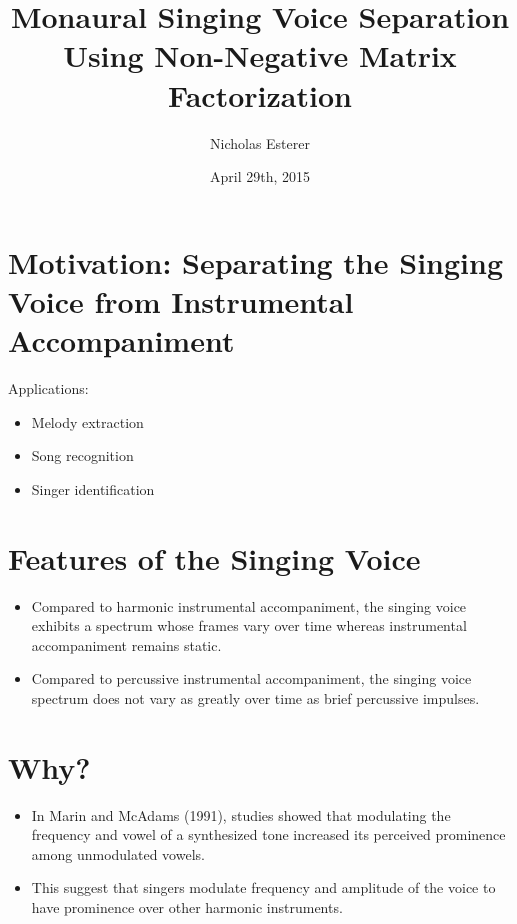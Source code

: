 \documentclass[72pt]{article}
\begin{document}
\begin{Huge}
\title{Monaural Singing Voice Separation Using Non-Negative Matrix 
Factorization}
\date{April 29th, 2015}
\author{Nicholas Esterer}
\maketitle

\newpage

\section*{Motivation: Separating the Singing Voice from Instrumental
Accompaniment}
Applications:
\begin{itemize}
    \item Melody extraction
    \item Song recognition    
    \item Singer identification
\end{itemize}

\newpage

\section*{Features of the Singing Voice}
\begin{itemize}
    \item Compared to harmonic instrumental accompaniment, the singing voice
            exhibits a spectrum whose frames vary over time whereas instrumental
            accompaniment remains static.
    \item Compared to percussive instrumental accompaniment, the singing voice
            spectrum does not vary as greatly over time as brief percussive
            impulses.
\end{itemize}

\newpage

\section*{Why?}
\begin{itemize}
    \item In Marin and McAdams (1991), studies showed that modulating the
            frequency and vowel of a synthesized tone increased its perceived
            prominence among unmodulated vowels.
    \item This suggest that singers modulate frequency and amplitude of the
voice to have prominence over other harmonic instruments.
\end{itemize}


\end{Huge}
\end{document}
